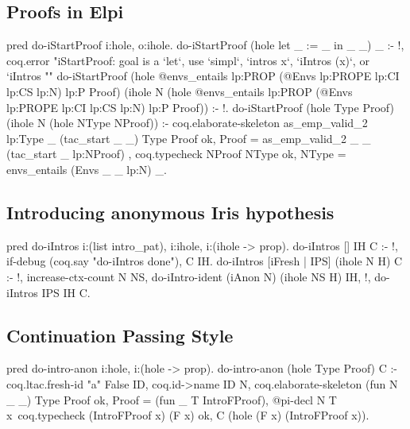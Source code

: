 \documentclass[thesis.tex]{subfiles}
\begin{document}
{\subsection{Proofs in Elpi}
\begin{elpicode}
  pred do-iStartProof i:hole, o:ihole.
  do-iStartProof (hole {{ let _ := _ in _ }} _) _ :- !,
    coq.error "iStartProof: goal is a `let`, use `simpl`, `intros x`, `iIntros (x)`, or `iIntros ""%
  do-iStartProof (hole {{ @envs_entails lp:PROP (@Envs lp:PROPE lp:CI lp:CS lp:N) lp:P }} Proof) (ihole N (hole {{ @envs_entails lp:PROP (@Envs lp:PROPE lp:CI lp:CS lp:N) lp:P }} Proof)) :- !.
  do-iStartProof (hole Type Proof) (ihole N (hole NType NProof)) :- 
    coq.elaborate-skeleton {{ as_emp_valid_2 lp:Type _ (tac_start _ _) }} Type Proof ok,
    Proof = {{ as_emp_valid_2 _ _ (tac_start _ lp:NProof) }},
    coq.typecheck NProof NType ok,
    NType = {{ envs_entails (Envs _ _ lp:N) _}}.
\end{elpicode}

\subsection{Introducing anonymous Iris hypothesis}
\begin{elpicode}
  pred do-iIntros i:(list intro_pat), i:ihole, i:(ihole -> prop).
  do-iIntros [] IH C :- !, if-debug (coq.say "do-iIntros done"), C IH.
  do-iIntros [iFresh | IPS] (ihole N H) C :- !,
    increase-ctx-count N NS,
    do-iIntro-ident (iAnon N) (ihole NS H) IH, !, 
    do-iIntros IPS IH C.
\end{elpicode}

\subsection{Continuation Passing Style}
\begin{elpicode}
  pred do-intro-anon i:hole, i:(hole -> prop).
  do-intro-anon (hole Type Proof) C :-
    coq.ltac.fresh-id "a" {{ False }} ID,
    coq.id->name ID N,
    coq.elaborate-skeleton (fun N _ _) Type Proof ok,
    Proof = (fun _ T IntroFProof),
    @pi-decl N T x\ 
      coq.typecheck (IntroFProof x) (F x) ok,
      C (hole (F x) (IntroFProof x)).
\end{elpicode}

}
\end{document}
